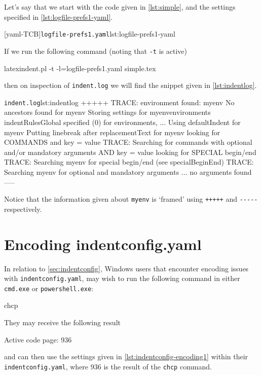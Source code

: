   \begin{example}
  Let's say that we start with the code given in \cref{lst:simple}, and the settings
  specified in \cref{lst:logfile-prefs1-yaml}.

  \begin{minipage}{.35\linewidth}
  \end{minipage}
  \hfill
  \begin{minipage}{.6\linewidth}
   [yaml-TCB]{\texttt{logfile-prefs1.yaml}}{lst:logfile-prefs1-yaml}
  \end{minipage}

  If we run the following command (noting that \texttt{-t} is active)

  \begin{commandshell}
latexindent.pl -t -l=logfile-prefs1.yaml simple.tex
\end{commandshell}

  then on inspection of \texttt{indent.log} we will find the snippet given in
  \cref{lst:indentlog}.
  \begin{cmhlistings}[style=tcblatex,morekeywords={TRACE}]{\texttt{indent.log}}{lst:indentlog}
       +++++
TRACE: environment found: myenv
       No ancestors found for myenv
       Storing settings for myenvenvironments
       indentRulesGlobal specified (0) for environments, ...
       Using defaultIndent for myenv
       Putting linebreak after replacementText for myenv
       looking for COMMANDS and key = {value}
TRACE: Searching for commands with optional and/or mandatory arguments AND key = {value}
       looking for SPECIAL begin/end
TRACE: Searching myenv for special begin/end (see specialBeginEnd)
TRACE: Searching myenv for optional and mandatory arguments
       ... no arguments found
       -----
     \end{cmhlistings}
  Notice that the information given about \texttt{myenv} is `framed' using \texttt{+++++}
  and \lstinline!-----! respectively.
  \end{example}

 \section{Encoding indentconfig.yaml}\label{app:encoding}
  In relation to \vref{sec:indentconfig}, Windows users that encounter encoding issues
  with \texttt{indentconfig.yaml}, may wish to run the following command in either
  \texttt{cmd.exe} or \texttt{powershell.exe}:
  \begin{dosprompt}
chcp
    \end{dosprompt}
  They may receive the following result
  \begin{dosprompt}
Active code page: 936
    \end{dosprompt}
  and can then use the settings given in \cref{lst:indentconfig-encoding1} within their
  \texttt{indentconfig.yaml}, where 936 is the result of the \texttt{chcp} command.

